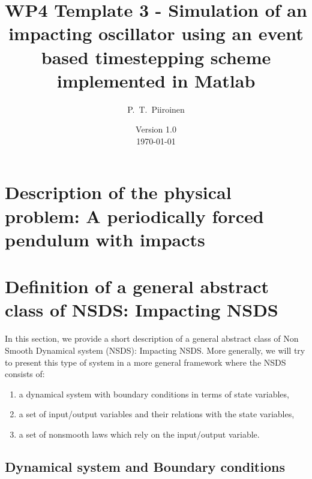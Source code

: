 \documentclass[10pt]{article}
\begin{document}
\thispagestyle{empty}
\title{WP4 Template 3 - Simulation of an impacting oscillator using an event based timestepping scheme implemented in Matlab}
\author{P.~T.~Piiroinen}

\date{Version 1.0 \\
\today}
\maketitle



\section{Description of the physical problem: A periodically forced pendulum with impacts}
\label{Sec:description}



\section{Definition of a general abstract class of NSDS: Impacting NSDS}
\label{Sec:descriptionNSDS}

In this section, we provide a short description of a general abstract class of Non Smooth Dynamical system (NSDS): Impacting NSDS. More generally, we will try to present this type of system in a more general framework where the NSDS consists of:
\begin{enumerate}
\item a dynamical system with boundary conditions in terms of state variables,
\item a set of input/output variables and their relations with the state variables,
\item a set of  nonsmooth laws which rely on the input/output variable.
\end{enumerate}

\subsection{Dynamical system and Boundary conditions}
\end{document}
